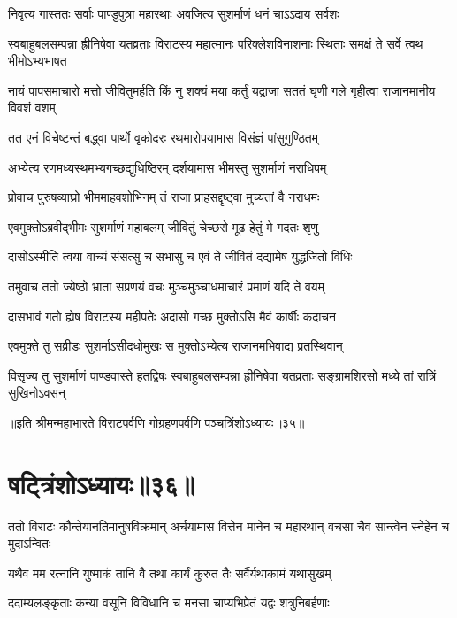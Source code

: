 \twolineshloka
{निवृत्य गास्ततः सर्वाः पाण्डुपुत्रा महारथाः}
{अवजित्य सुशर्माणं धनं चाऽऽदाय सर्वशः}


\threelineshloka
{स्वबाहुबलसम्पन्ना ह्रीनिषेवा यतव्रताः}
{विराटस्य महात्मानः परिक्लेशविनाशनाः}
{स्थिताः समक्षं ते सर्वे त्वथ भीमोऽभ्यभाषत}


\threelineshloka
{नायं पापसमाचारो मत्तो जीवितुमर्हति}
{किं नु शक्यं मया कर्तुं यद्राजा सततं घृणी}
{गले गृहीत्वा राजानमानीय विवशं वशम्}


\twolineshloka
{तत एनं विचेष्टन्तं बद्ध्वा पार्थो वृकोदरः}
{रथमारोपयामास विसंज्ञं पांसुगुण्ठितम्}


\twolineshloka
{अभ्येत्य रणमध्यस्थमभ्यगच्छद्युधिष्ठिरम्}
{दर्शयामास भीमस्तु सुशर्माणं नराधिपम्}


\twolineshloka
{प्रोवाच पुरुषव्याघ्रो भीममाहवशोभिनम्}
{तं राजा प्राहसद्दृष्ट्वा मुच्यतां वै नराधमः}


\twolineshloka
{एवमुक्तोऽब्रवीद्भीमः सुशर्माणं महाबलम्}
{जीवितुं चेच्छसे मूढ हेतुं मे गदतः शृणु}


\twolineshloka
{दासोऽस्मीति त्वया वाच्यं संसत्सु च सभासु च}
{एवं ते जीवितं दद्यामेष युद्धजितो विधिः}


\twolineshloka
{तमुवाच ततो ज्येष्ठो भ्राता सप्रणयं वचः}
{मुञ्चमुञ्चाधमाचारं प्रमाणं यदि ते वयम्}


\twolineshloka
{दासभावं गतो ह्येष विराटस्य महीपतेः}
{अदासो गच्छ मुक्तोऽसि मैवं कार्षीः कदाचन}


\twolineshloka
{एवमुक्ते तु सव्रीडः सुशर्माऽसीदधोमुखः}
{स मुक्तोऽभ्येत्य राजानमभिवाद्य प्रतस्थिवान्}


\threelineshloka
{विसृज्य तु सुशर्माणं पाण्डवास्ते हतद्विषः}
{स्वबाहुबलसम्पन्ना ह्रीनिषेवा यतव्रताः}
{सङ्ग्रामशिरसो मध्ये तां रात्रिं सुखिनोऽवसन्}

॥इति श्रीमन्महाभारते विराटपर्वणि गोग्रहणपर्वणि पञ्चत्रिंशोऽध्यायः॥३५॥

\chapter{षट्त्रिंशोऽध्यायः॥३६॥}

\threelineshloka
{ततो विराटः कौन्तेयानतिमानुषविक्रमान्}
{अर्चयामास वित्तेन मानेन च महारथान्}
{वचसा चैव सान्त्वेन स्नेहेन च मुदाऽन्वितः}




\twolineshloka
{यथैव मम रत्नानि युष्माकं तानि वै तथा}
{कार्यं कुरुत तैः सर्वैर्यथाकामं यथासुखम्}


\twolineshloka
{ददाम्यलङ्कृताः कन्या वसूनि विविधानि च}
{मनसा चाप्यभिप्रेतं यद्वः शत्रुनिबर्हणाः}


